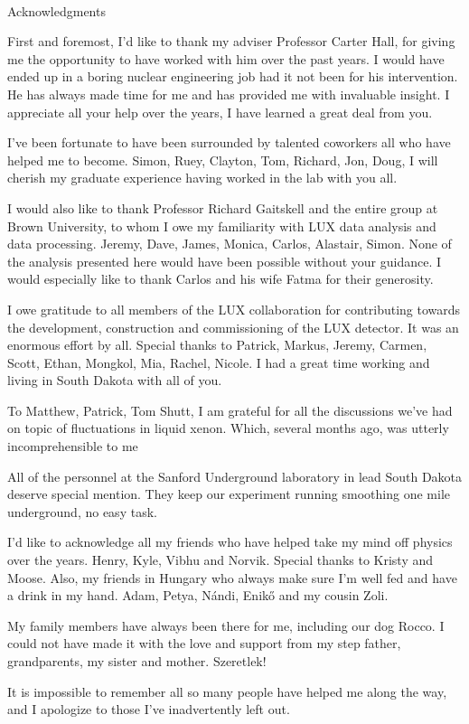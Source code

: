 
\renewcommand{\baselinestretch}{2}
\small\normalsize
\hbox{\ }
 
\vspace{-.65in}

\begin{center}
\large{Acknowledgments} 
\end{center} 

\vspace{1ex}


First and foremost, I'd like to thank my adviser Professor Carter Hall, for giving me the opportunity to have worked with him over the past years. I would have ended up in a boring nuclear engineering job had it not been for his intervention. He has always made time for me and has provided me with invaluable insight. I appreciate all your help over the years, I have learned a great deal from you.

I've been fortunate to have been surrounded by talented coworkers all who have helped me to become. Simon, Ruey, Clayton, Tom, Richard, Jon, Doug, I will cherish my graduate experience having worked in the lab with you all.

I would also like to thank Professor Richard Gaitskell and the entire group at Brown University, to whom I owe my familiarity with LUX data analysis and data processing. Jeremy, Dave, James, Monica, Carlos, Alastair, Simon. None of the analysis presented here would have been possible without your guidance. I would especially like to thank Carlos and his wife Fatma for their generosity.

I owe gratitude to all members of the LUX collaboration for contributing towards the development, construction and commissioning of the LUX detector. It was an enormous effort by all. Special thanks to Patrick, Markus, Jeremy, Carmen, Scott, Ethan, Mongkol, Mia, Rachel, Nicole. I had a great time working and living in South Dakota with all of you.

To Matthew, Patrick, Tom Shutt, I am grateful for all the discussions we've had on topic of fluctuations in liquid xenon. Which, several months ago, was utterly incomprehensible to me

All of the personnel at the Sanford Underground laboratory in lead South Dakota deserve special mention. They keep our experiment running smoothing one mile underground, no easy task. 

I'd like to acknowledge all my friends who have helped take my mind off physics over the years. Henry, Kyle, Vibhu and Norvik. Special thanks to Kristy and Moose. Also, my friends in Hungary who always make sure I'm well fed and have a drink in my hand. Adam, Petya, N\'{a}ndi, Enik\H{o} and my cousin Zoli. 

My family members have always been there for me, including our dog Rocco. I could not have made it with the love and support from my step father, grandparents, my sister and mother. Szeretlek!


It is impossible to remember all so many people have helped me along the way, and I apologize to those I've inadvertently left out.
